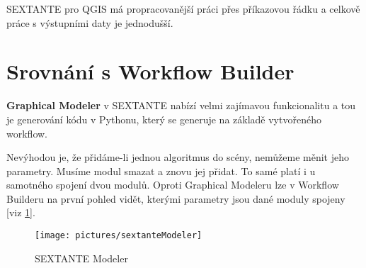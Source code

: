SEXTANTE pro QGIS má propracovanější práci přes příkazovou řádku a
celkově práce s výstupními daty je jednodušší.

\section{Srovnání s Workflow Builder}

\textbf{Graphical Modeler} v SEXTANTE nabízí velmi zajímavou funkcionalitu a tou je generování kódu v Pythonu, který se generuje na základě vytvořeného workflow.

Nevýhodou je, že přidáme-li jednou algoritmus do scény, nemůžeme měnit
jeho parametry. Musíme modul smazat a znovu jej přidat. To samé platí
i u samotného spojení dvou modulů. Oproti Graphical Modeleru lze v
Workflow Builderu na první pohled vidět, kterými parametry jsou dané
moduly spojeny [viz \figurename \ref{sextanteModeler}].

\begin{figure}[H]
	\centering
	\texttt{[image: pictures/sextanteModeler]}
	\caption{SEXTANTE Modeler}
  	\label{sextanteModeler}
\end{figure}

